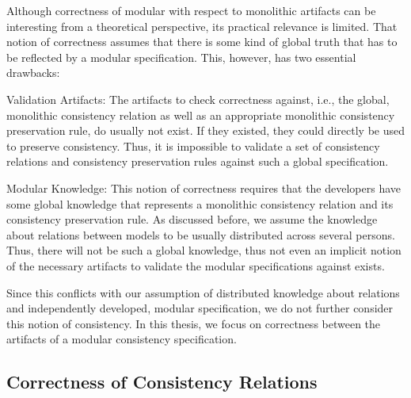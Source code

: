 Although correctness of modular with respect to monolithic artifacts can be interesting from a theoretical perspective, its practical relevance is limited.
That notion of correctness assumes that there is some kind of global truth that has to be reflected by a modular specification.
This, however, has two essential drawbacks:
\begin{properdescription}
    \item[Validation Artifacts:] The artifacts to check correctness against, i.e., the global, monolithic consistency relation as well as an appropriate monolithic consistency preservation rule, do usually not exist. If they existed, they could directly be used to preserve consistency. Thus, it is impossible to validate a set of consistency relations and consistency preservation rules against such a global specification.
    \item[Modular Knowledge:] This notion of correctness requires that the developers have some global knowledge that represents a monolithic consistency relation and its consistency preservation rule. As discussed before, we assume  the knowledge about relations between models to be usually distributed across several persons. Thus, there will not be such a global knowledge, thus not even an implicit notion of the necessary artifacts to validate the modular specifications against exists. %
\end{properdescription}
%
Since this conflicts with our assumption of distributed knowledge about relations and independently developed, modular specification, we do not further consider this notion of consistency.
In this thesis, we focus on correctness between the artifacts of a modular consistency specification.


\subsection{Correctness of Consistency Relations}
\label{chap:correctness:notions_correctness:relations}

